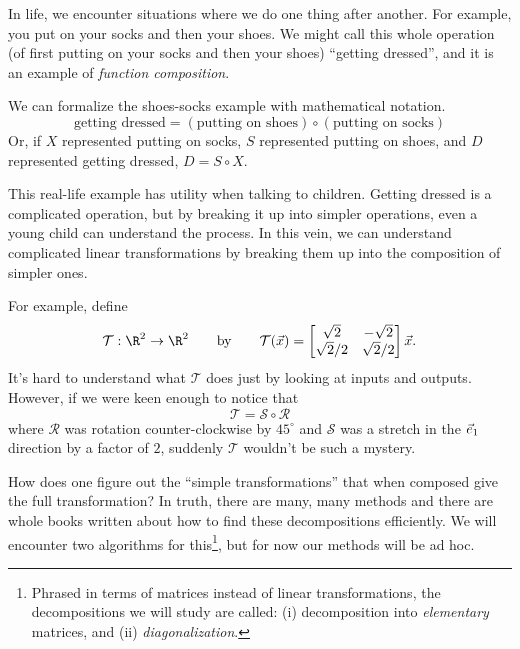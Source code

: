 
In life, we encounter situations where we do one thing after another. For example, you
put on your socks and then your shoes. We might call this whole operation (of first putting on your socks
and then your shoes) ``getting dressed'', and it is an example of \emph{function composition}. 


We can formalize the shoes-socks example 
with mathematical notation.
\[
	\text{getting dressed} = (\text{putting on shoes})\circ (\text{putting on socks})
\]
Or, if $X$ represented putting on socks, $S$ represented putting on shoes, and $D$ represented getting dressed,
$D=S\circ X$.

This real-life example has utility when talking to children. Getting dressed is a complicated operation, but by breaking
it up into simpler operations, even a young child can understand the process. In this vein, we can understand
complicated linear transformations by breaking them up into the composition of simpler ones.

For example, define
\[
	\mathcal T:\R^2\to\R^2\qquad\text{by}\qquad \mathcal T(\vec x)=\matc{\sqrt{2}&-\sqrt{2}\\{\sqrt{2}}/{2} & {\sqrt{2}}/{2}}\vec x.
\]
It's hard to understand what $\mathcal T$ does just by looking at inputs and outputs. However, if we were keen enough to notice that
\[
	\mathcal T=\mathcal S\circ \mathcal R
\]
where $\mathcal R$ was rotation counter-clockwise by $45^\circ$ and $\mathcal S$ was a stretch in the ${\vec e_1}$ direction by a factor of $2$,
suddenly $\mathcal T$ wouldn't be such a mystery.

\medskip
How does one figure out the ``simple transformations'' that when composed give the full transformation?
In truth, there are many, many methods and there are whole books written about how to find these decompositions efficiently.
We will encounter two algorithms for this\footnote{ Phrased in terms of matrices instead of linear transformations, the decompositions we
will study are called: (i) decomposition into \emph{elementary} matrices, and (ii) \emph{diagonalization}.}, but for now
our methods will be ad hoc.

